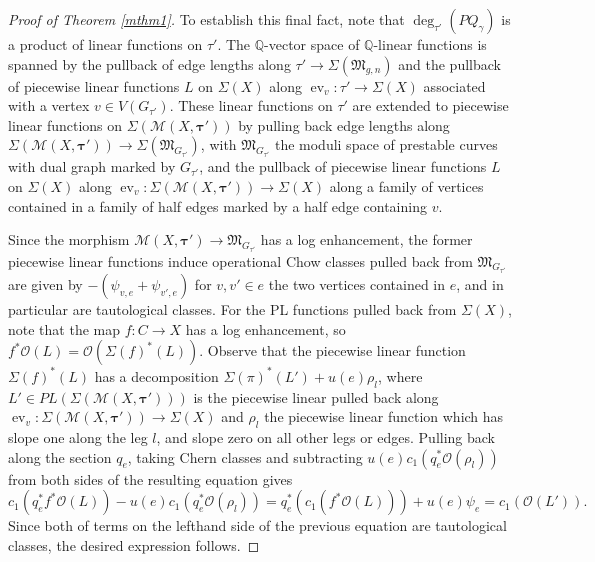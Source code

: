 \documentclass[12pt, oneside]{amsart}   	%
\newcounter{thm}
\newcommand{\ev}{\operatorname{ev}}
\numberwithin{equation}{section}
\numberwithin{thm}{section}
\numberwithin{figure}{section}
\begin{document}
\begin{proof}[Proof of Theorem \ref{mthm1}]
To establish this final fact, note that $\deg_{\tau'}(PQ_{\gamma})$ is a product of linear functions on $\tau'$. The $\mathbb{Q}$-vector space of $\mathbb{Q}$-linear functions is spanned by the pullback of edge lengths along $\tau' \rightarrow \Sigma(\mathfrak{M}_{g,n})$ and the pullback of piecewise linear functions $L$ on $\Sigma(X)$ along $\ev_v: \tau' \rightarrow \Sigma(X)$ associated with a vertex $v \in V(G_{\tau'})$. These linear functions on $\tau'$ are extended to piecewise linear functions on $\Sigma(\mathscr{M}(X,\pmb\tau'))$ by pulling back edge lengths along $\Sigma(\mathscr{M}(X,\pmb\tau')) \rightarrow \Sigma(\mathfrak{M}_{G_{\tau'}})$, with $\mathfrak{M}_{G_{\tau'}}$ the moduli space of prestable curves with dual graph marked by $G_{\tau'}$, and the pullback of piecewise linear functions $L$ on $\Sigma(X)$ along $\ev_v: \Sigma(\mathscr{M}(X,\pmb\tau')) \rightarrow \Sigma(X)$ along a family of vertices contained in a family of half edges marked by a half edge containing $v$. 

Since the morphism $\mathscr{M}(X,\pmb\tau') \rightarrow \mathfrak{M}_{G_{\tau'}}$ has a log enhancement, the former piecewise linear functions induce operational Chow classes pulled back from $\mathfrak{M}_{G_{\tau'}}$ are given by $-(\psi_{v,e} + \psi_{v',e})$ for $v,v' \in e$ the two vertices contained in $e$, and in particular are tautological classes. For the PL functions pulled back from $\Sigma(X)$, note that the map $f: C \rightarrow X$ has a log enhancement, so $f^*\mathcal{O}(L) = \mathcal{O}(\Sigma(f)^*(L))$. Observe that the piecewise linear function $\Sigma(f)^*(L)$ has a decomposition $\Sigma(\pi)^*(L') + u(e)\rho_l$, where $L' \in PL(\Sigma(\mathscr{M}(X,\pmb\tau')))$ is the piecewise linear pulled back along $\ev_{v}: \Sigma(\mathscr{M}(X,\pmb\tau')) \rightarrow \Sigma(X)$ and $\rho_l$ the piecewise linear function which has slope one along the leg $l$, and slope zero on all other legs or edges. Pulling back along the section $q_e$, taking Chern classes and subtracting $u(e)c_1(q_e^*\mathcal{O}(\rho_l))$ from both sides of the resulting equation gives
 $$c_1(q_e^*f^*\mathcal{O}(L)) - u(e)c_1(q_e^*\mathcal{O}(\rho_l)) = q_e^*(c_1(f^*\mathcal{O}(L)))  + u(e)\psi_e =  c_1(\mathcal{O}(L')).$$
Since both of terms on the lefthand side of the previous equation are tautological classes, the desired expression follows.


\end{proof}
\end{document}
